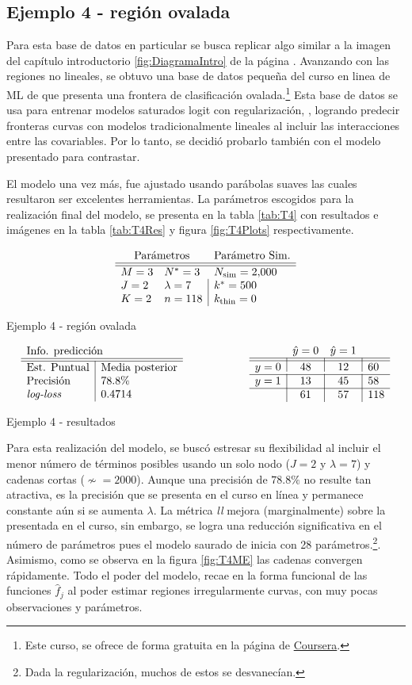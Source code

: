 \documentclass[../Main/Main.tex]{subfiles}
\begin{document}
\subsection*{Ejemplo 4 - región ovalada}
Para esta base de datos en particular se busca replicar algo similar a la imagen del capítulo introductorio \ref{fig:DiagramaIntro} de la página \pageref{fig:DiagramaIntro}. Avanzando con las regiones no lineales, se obtuvo una base de datos pequeña del curso en linea de ML de \citet{andrew2018ml} que presenta una frontera de clasificación ovalada.\footnote{Este curso, se ofrece de forma gratuita en la página de \href{https://www.coursera.org/learn/machine-learning}{Coursera}.} Esta base de datos se usa para entrenar modelos saturados logit con regularización, \citet{hastie2008elements}, logrando predecir fronteras curvas con modelos tradicionalmente lineales al incluir las interacciones entre las covariables. Por lo tanto, se decidió probarlo también con el modelo presentado para contrastar.

El modelo una vez más, fue ajustado usando parábolas suaves las cuales resultaron ser excelentes herramientas. La parámetros escogidos para la realización final del modelo, se presenta en la tabla \ref{tab:T4} con resultados e imágenes en la tabla \ref{tab:T4Res} y figura \ref{fig:T4Plots} respectivamente.  
\begin{table}[h]
$$\paramsmod{3}{2}{2}{3}{7}{118}{\num{2000}}{500}{0}$$
\caption{Ejemplo 4 - región ovalada}
\label{tab:T4}
\end{table}

\begin{table}[h]
\begin{align*}
\resultados{\text{Media posterior}}{78.8}{0.4714}
\qquad\qquad\qquad
\matconf{48}{12}{60}{13}{45}{58}{61}{57}{118}
\end{align*}
\caption{Ejemplo 4 - resultados}
\label{tab:Test4Ej9Res}
\end{table}

Para esta realización del modelo, se buscó estresar su flexibilidad al incluir el menor número de términos posibles usando un solo nodo ($J = 2$ y $\lambda = 7$) y cadenas cortas ($\nsim = \num{2000}$). Aunque una precisión de $78.8\%$ no resulte tan atractiva, es la precisión que se presenta en el curso en línea y permanece constante aún si se aumenta $\lambda$. La métrica \textit{ll} mejora (marginalmente) sobre la presentada en el curso, sin embargo, se logra una reducción significativa en el número de parámetros pues el modelo saurado de \citet{andrew2018ml} inicia con 28 parámetros.\footnote{Dada la regularización, muchos de estos se desvanecían.}. Asimismo, como se observa en la figura \ref{fig:T4ME} las cadenas convergen rápidamente. Todo el poder del modelo, recae en la forma funcional de las funciones $\hat{f}_j$ al poder estimar regiones irregularmente curvas, con muy pocas observaciones y parámetros. 
\end{document}
